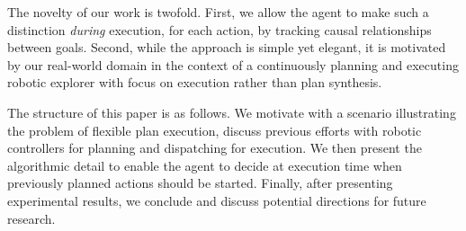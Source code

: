 The novelty of our work is twofold. First, we allow the agent to make
such a distinction \emph{during} execution, for each action, by
tracking causal relationships between goals. Second, while the
approach is simple yet elegant, it is motivated by our real-world
domain in the context of a continuously planning and executing robotic
explorer with focus on execution rather than plan synthesis.


The structure of this paper is as follows. We motivate with a
scenario illustrating the problem of flexible plan execution, discuss
previous efforts with robotic controllers for planning and dispatching
for execution. We then present the algorithmic detail to enable the
agent to decide at execution time when previously planned actions 
should be started. Finally, after presenting experimental results, 
we conclude and discuss potential directions for future research.

